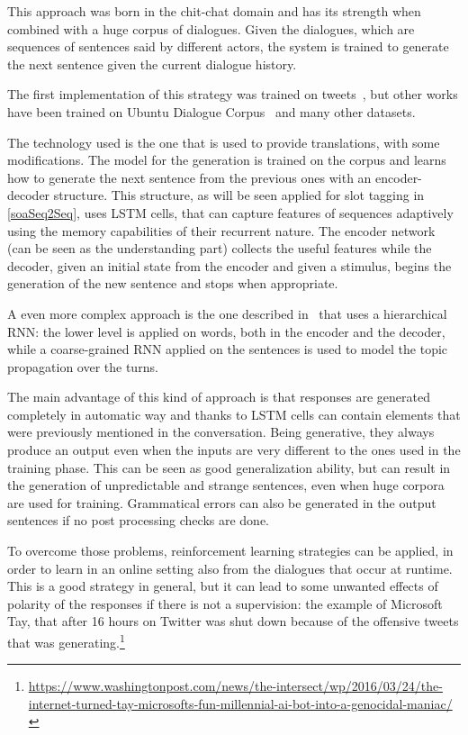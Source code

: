 This approach was born in the chit-chat domain and has its strength when combined with a huge corpus of dialogues. Given the dialogues, which are sequences of sentences said by different actors, the system is trained to generate the next sentence given the current dialogue history.

The first implementation of this strategy was trained on tweets~\cite{ritter2011data}, but other works have been trained on Ubuntu Dialogue Corpus~\cite{lowe2015ubuntu} and many other datasets.

The technology used is the one that is used to provide translations, with some modifications. The model for the generation is trained on the corpus and learns how to generate the next sentence from the previous ones with an encoder-decoder structure. This structure, as will be seen applied for slot tagging in \ref{soaSeq2Seq}, uses LSTM cells, that can capture features of sequences adaptively using the memory capabilities of their recurrent nature. The encoder network (can be seen as the understanding part) collects the useful features while the decoder, given an initial state from the encoder and given a stimulus, begins the generation of the new sentence and stops when appropriate.

A even more complex approach is the one described in~\cite{serban2016building} that uses a hierarchical RNN: the lower level is applied on words, both in the encoder and the decoder, while a coarse-grained RNN applied on the sentences is used to model the topic propagation over the turns.

The main advantage of this kind of approach is that responses are generated completely in automatic way and thanks to LSTM cells can contain elements that were previously mentioned in the conversation. Being generative, they always produce an output even when the inputs are very different to the ones used in the training phase. This can be seen as good generalization ability, but can result in the generation of unpredictable and strange sentences, even when huge corpora are used for training. Grammatical errors can also be generated in the output sentences if no post processing checks are done.

To overcome those problems, reinforcement learning strategies can be applied, in order to learn in an online setting also from the dialogues that occur at runtime. This is a good strategy in general, but it can lead to some unwanted effects of polarity of the responses if there is not a supervision: the example of Microsoft Tay, that after 16 hours on Twitter was shut down because of the offensive tweets that was generating.\footnote{\url{https://www.washingtonpost.com/news/the-intersect/wp/2016/03/24/the-internet-turned-tay-microsofts-fun-millennial-ai-bot-into-a-genocidal-maniac/}}

